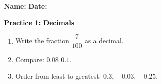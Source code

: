 \documentclass[12pt, letterpaper, fleqn]{article}
\newcommand{\blank}{\underline{\hspace{2.2cm}}}
\begin{document}
\textbf{Name:} \underline{\hspace{5cm}}
\hfill
\textbf{Date:} \underline{\hspace{3cm}}\\

\begin{tcolorbox}[colback=customteal!20]
    \large\textcolor{black}{\textbf{Practice 1: Decimals}}
\end{tcolorbox}
\begin{enumerate}[itemsep=3.5cm, leftmargin=0.6cm]
\item Write the fraction $\dfrac{7}{100}$ as a decimal.
\vspace{3.5cm}
\item Compare: $0.08$ \blank $0.1$.
\vspace{3.5cm}
\item Order from least to greatest: $0.3, \quad 0.03, \quad 0.25$.
\end{enumerate}
\end{document}
